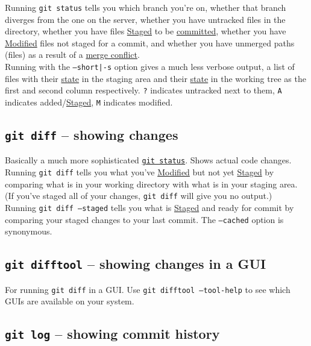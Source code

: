 \documentclass[table, xcdraw]{article}%
\begin{document}
Running \texttt{git status} tells you which branch you're on, whether that branch diverges from the one on the server, whether you have untracked files in the directory, whether you have files \hyperref[states]{Staged} to be \hyperref[commit]{committed}, whether you have \hyperref[states]{Modified} files not staged for a commit, and whether you have unmerged paths (files) as a result of a \hyperref[merge]{merge conflict}.\\
Running with the \texttt{--short|-s} option gives a much less verbose output, a list of files with their \hyperref[states]{state} in the staging area and their \hyperref[states]{state} in the working tree as the first and second column respectively. \texttt{?} indicates untracked next to them, \texttt{A} indicates added/\hyperref[states]{Staged}, \texttt{M} indicates modified.

\subsection{\texttt{git diff} -- showing changes}

Basically a much more sophisticated \hyperref[status]{\texttt{git status}}. Shows actual code changes.\\
Running \texttt{git diff} tells you what you've \hyperref[states]{Modified} but not yet \hyperref[states]{Staged} by comparing what is in your working directory with what is in your staging area. (If you've staged all of your changes, \texttt{git diff} will give you no output.)\\
Running \texttt{git diff --staged} tells you what is \hyperref[states]{Staged} and ready for commit by comparing your staged changes to your last commit. The \texttt{--cached} option is synonymous.

\subsection{\texttt{git difftool} -- showing changes in a GUI}

For running \texttt{git diff} in a GUI. Use \texttt{git difftool --tool-help} to see which GUIs are available on your system.

\subsection{\texttt{git log} -- showing commit history}
\end{document}
